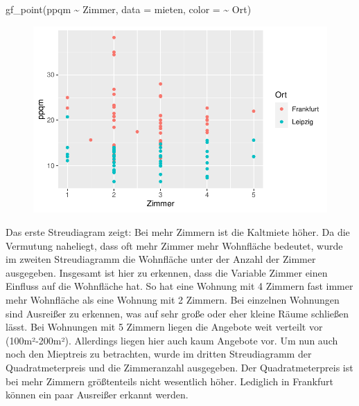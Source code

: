 \documentclass[
  a4paper,
  DIV=11]{scrartcl}
\newenvironment{Shaded}{\begin{snugshade}}{\end{snugshade}}
\newcommand{\AttributeTok}[1]{\textcolor[rgb]{0.40,0.45,0.13}{#1}}
\newcommand{\FunctionTok}[1]{\textcolor[rgb]{0.28,0.35,0.67}{#1}}
\newcommand{\NormalTok}[1]{\textcolor[rgb]{0.00,0.23,0.31}{#1}}
\newcommand{\SpecialCharTok}[1]{\textcolor[rgb]{0.37,0.37,0.37}{#1}}
\begin{document}
\begin{Shaded}
\begin{Highlighting}[]
\FunctionTok{gf\_point}\NormalTok{(ppqm }\SpecialCharTok{\textasciitilde{}}\NormalTok{ Zimmer, }\AttributeTok{data =}\NormalTok{ mieten, }\AttributeTok{color =} \SpecialCharTok{\textasciitilde{}}\NormalTok{ Ort)}
\end{Highlighting}
\end{Shaded}

\begin{figure}[H]

{\centering \includegraphics{Mietmodellierung_files/figure-pdf/unnamed-chunk-20-3.pdf}

}

\end{figure}

Das erste Streudiagram zeigt: Bei mehr Zimmern ist die Kaltmiete höher.
Da die Vermutung naheliegt, dass oft mehr Zimmer mehr Wohnfläche
bedeutet, wurde im zweiten Streudiagramm die Wohnfläche unter der Anzahl
der Zimmer ausgegeben. Insgesamt ist hier zu erkennen, dass die Variable
Zimmer einen Einfluss auf die Wohnfläche hat. So hat eine Wohnung mit 4
Zimmern fast immer mehr Wohnfläche als eine Wohnung mit 2 Zimmern. Bei
einzelnen Wohnungen sind Ausreißer zu erkennen, was auf sehr große oder
eher kleine Räume schließen lässt. Bei Wohnungen mit 5 Zimmern liegen
die Angebote weit verteilt vor (100m²-200m²). Allerdings liegen hier
auch kaum Angebote vor. Um nun auch noch den Mieptreis zu betrachten,
wurde im dritten Streudiagramm der Quadratmeterpreis und die
Zimmeranzahl ausgegeben. Der Quadratmeterpreis ist bei mehr Zimmern
größtenteils nicht wesentlich höher. Lediglich in Frankfurt können ein
paar Ausreißer erkannt werden.
\end{document}
